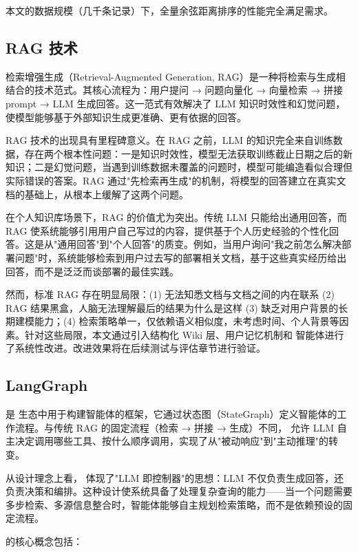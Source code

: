 本文的数据规模（几千条记录）下，全量余弦距离排序的性能完全满足需求。

\subsection{RAG 技术}

检索增强生成（Retrieval-Augmented Generation, RAG）是一种将检索与生成相结合的技术范式。其核心流程为：用户提问 → 问题向量化 → 向量检索 → 拼接 prompt → LLM 生成回答。这一范式有效解决了 LLM 知识时效性和幻觉问题，使模型能够基于外部知识生成更准确、更有依据的回答。

RAG 技术的出现具有里程碑意义。在 RAG 之前，LLM 的知识完全来自训练数据，存在两个根本性问题：一是知识时效性，模型无法获取训练截止日期之后的新知识；二是幻觉问题\cite{ji2023hallucination}，当遇到训练数据未覆盖的问题时，模型可能编造看似合理但实际错误的答案。RAG 通过"先检索再生成"的机制，将模型的回答建立在真实文档的基础上，从根本上缓解了这两个问题。

在个人知识库场景下，RAG 的价值尤为突出。传统 LLM 只能给出通用回答，而 RAG 使系统能够引用用户自己写过的内容，提供基于个人历史经验的个性化回答。这是从"通用回答"到"个人回答"的质变。例如，当用户询问"我之前怎么解决部署问题"时，系统能够检索到用户过去写的部署相关文档，基于这些真实经历给出回答，而不是泛泛而谈部署的最佳实践。

然而，标准 RAG 存在明显局限：(1) 无法知悉文档与文档之间的内在联系 (2) RAG 结果黑盒，人脑无法理解最后的结果为什么是这样 (3) 缺乏对用户背景的长期建模能力；(4) 检索策略单一，仅依赖语义相似度，未考虑时间、个人背景等因素。针对这些局限，本文通过引入结构化 Wiki 层、用户记忆机制和  智能体进行了系统性改进。改进效果将在后续测试与评估章节进行验证。

\subsection{LangGraph}

 是  生态中用于构建智能体的框架，它通过状态图（StateGraph）定义智能体的工作流程。与传统 RAG 的固定流程（检索 → 拼接 → 生成）不同， 允许 LLM 自主决定调用哪些工具、按什么顺序调用，实现了从"被动响应"到"主动推理"的转变。

从设计理念上看， 体现了"LLM 即控制器"的思想：LLM 不仅负责生成回答，还负责决策和编排。这种设计使系统具备了处理复杂查询的能力——当一个问题需要多步检索、多源信息整合时，智能体能够自主规划检索策略，而不是依赖预设的固定流程。

 的核心概念包括：

